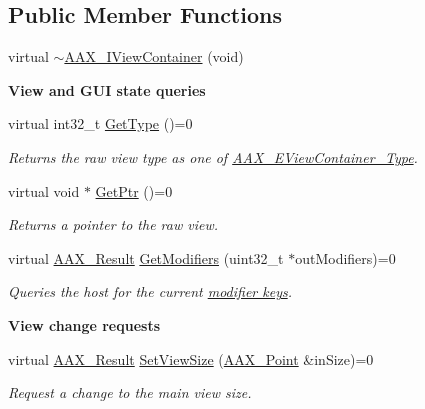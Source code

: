 \subsection*{Public Member Functions}
\begin{DoxyCompactItemize}
\item 
virtual \hyperlink{a00117_af41d1aaaf56e5f4e949fffc688a04247}{$\sim$\+A\+A\+X\+\_\+\+I\+View\+Container} (void)
\end{DoxyCompactItemize}
\begin{Indent}{\bf View and G\+U\+I state queries}\par
\begin{DoxyCompactItemize}
\item 
virtual int32\+\_\+t \hyperlink{a00117_a1715c042ed8412a2135f4d9e5109e8fb}{Get\+Type} ()=0
\begin{DoxyCompactList}\small\item\em Returns the raw view type as one of \hyperlink{a00214_ab4c36de253fc80b541eb51074c64caef}{A\+A\+X\+\_\+\+E\+View\+Container\+\_\+\+Type}. \end{DoxyCompactList}\item 
virtual void $\ast$ \hyperlink{a00117_adfde8f90c9a29b83dc80042cf9c3f749}{Get\+Ptr} ()=0
\begin{DoxyCompactList}\small\item\em Returns a pointer to the raw view. \end{DoxyCompactList}\item 
virtual \hyperlink{a00149_a4d8f69a697df7f70c3a8e9b8ee130d2f}{A\+A\+X\+\_\+\+Result} \hyperlink{a00117_ac2fe16f6d81a8d941e36242d9f9d0980}{Get\+Modifiers} (uint32\+\_\+t $\ast$out\+Modifiers)=0
\begin{DoxyCompactList}\small\item\em Queries the host for the current \hyperlink{a00206_a47756e0a56d00468b7045eb26500cb78}{modifier keys}. \end{DoxyCompactList}\end{DoxyCompactItemize}
\end{Indent}
\begin{Indent}{\bf View change requests}\par
\begin{DoxyCompactItemize}
\item 
virtual \hyperlink{a00149_a4d8f69a697df7f70c3a8e9b8ee130d2f}{A\+A\+X\+\_\+\+Result} \hyperlink{a00117_ad750e9f0231c61ab32114276ee8cb5f7}{Set\+View\+Size} (\hyperlink{a00119}{A\+A\+X\+\_\+\+Point} \&in\+Size)=0
\begin{DoxyCompactList}\small\item\em Request a change to the main view size. \end{DoxyCompactList}\end{DoxyCompactItemize}
\end{Indent}
